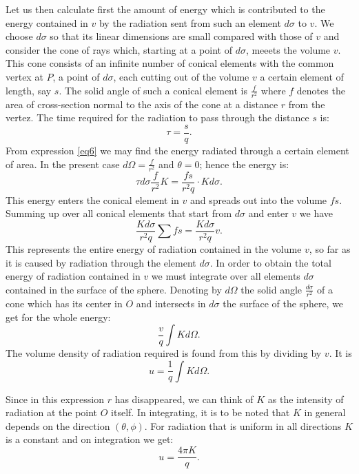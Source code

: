 \documentclass[12pt,oneside]{book}
\begin{document}
Let us then calculate first the amount of energy which is contributed to the energy contained in $v$ by the radiation sent from such an element $d\sigma$ to $v$. We choose $d\sigma$ so that its linear dimensions are small compared with those of $v$ and consider the cone of rays which, starting at a point of $d\sigma$, meeets the volume $v$. This cone consists of an infinite number of conical elements with the common vertex at $P$, a point of $d\sigma$, each cutting out of the volume $v$ a certain element of length, say $s$. The solid angle of such a conical element is $\frac{f}{r^2}$ where $f$ denotes the area of cross-section normal to the axis of the cone at a distance $r$ from the vertez. The time required for the radiation to pass through the distance $s$ is:
$$\tau=\frac{s}{q}.$$
From expression \eqref{eq6} we may find the energy radiated through a certain element of area. In the present case $d\Omega =\frac{f}{r^2}$ and $\theta=0$; hence the energy is:
\begin{equation}
    \tau d\sigma \frac{f}{r^2}K=\frac{fs}{r^2q}\cdot Kd\sigma.
    \label{eq19}
\end{equation}
This energy enters the conical element in $v$ and spreads out into the volume $fs$. Summing up over all conical elements that start from $d\sigma$ and enter $v$ we have
$$\frac{Kd\sigma}{r^2q}\sum fs=\frac{Kd\sigma}{r^2q}v.$$
This represents the entire energy of radiation contained in the volume $v$, so far as it is caused by radiation through the element $d\sigma$. In order to obtain the total energy of radiation contained in $v$ we must integrate over all elements $d\sigma$ contained in the surface of the sphere. Denoting by $d\Omega$ the solid angle $\frac{d\sigma}{r^2}$ of a cone which has its center in $O$ and intersects in $d\sigma$ the surface of the sphere, we get for the whole energy:
$$\frac{v}{q}\int Kd\Omega.$$
The volume density of radiation required is found from this by dividing by $v$. It is
\begin{equation}
    u=\frac{1}{q}\int Kd\Omega.
    \label{eq20}
\end{equation} \par

Since in this expression $r$ has disappeared, we can think of $K$ as the intensity of radiation at the point $O$ itself. In integrating, it is to be noted that $K$ in general depends on the direction $(\theta,\phi)$. For radiation that is uniform in all directions $K$ is a constant and on integration we get:
\begin{equation}
    u=\frac{4\pi K}{q}.
    \label{eq21}
\end{equation} \par
\end{document}
